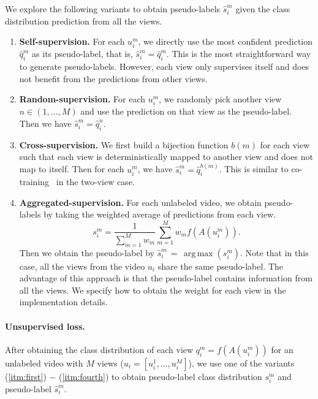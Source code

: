 \documentclass[10pt,twocolumn,letterpaper]{article}
\DeclareMathOperator*{\argmax}{arg\,max}
\begin{document}
We explore the following variants to obtain pseudo-labels $\hat{s}_i^m$ given the class distribution prediction from all the views.
\begin{enumerate}[label=\roman*]
	\item\label{itm:first}  \textbf{Self-supervision.} For each  $u_i^m$, we directly use the most confident prediction $\hat{q}_i^m$ as its pseudo-label, that is, $\hat{s}_i^m=\hat{q}_i^m$.
	This is the most straightforward way to generate pseudo-labels. However, each view only supervises itself and does not benefit from the predictions from other views.
	
	
	\item\label{itm:second}  \textbf{Random-supervision.} 
	For each  $u_i^m$, we randomly pick another view 
	$n \in (1,\ldots,M)$ and use the prediction on that view as the pseudo-label. Then we have $\hat{s}_i^m=\hat{q}_i^n$.
	
	\item\label{itm:third}  \textbf{Cross-supervision.} We first build a bijection function $b(m)$ for each view such that each view is deterministically mapped to another view and does not map to itself.  Then for each $u_i^m$, we  have $\hat{s}_i^m=\hat{q}_i^{b(m)}$.
	This is similar to co-training~\cite{blum1998combining} in the two-view case.
	
	\item\label{itm:fourth}  \textbf{Aggregated-supervision.} For each unlabeled video, we obtain pseudo-labels by taking the weighted average of predictions from each view. 
	\begin{equation}
		\label{eq:loss1}
		s_i^m = \frac{1}{\sum_{m=1}^{M} {w_m}}\sum_{m=1}^{M} w_m f(A(u_{i}^{m})).
	\end{equation}
	Then we obtain the  pseudo-label by $\hat{s}_i^m\,{=}\,\argmax(s_i^m)$.
	Note that in this case, all the views from the video $u_{i}$ share the same pseudo-label. The advantage of this approach is that the pseudo-label contains information from all the views. {We specify how to obtain the weight for each view in the implementation details.}
\end{enumerate}

\paragraph{Unsupervised loss.} 
After obtaining the class distribution of each view  $q_i^m = f(A(u_i^m))$ {for} an unlabeled video with $M$ views ($u_i=[u_i^1,...,u_i^M]$), we use one of the variants (\ref{itm:first}) $-$ (\ref{itm:fourth}) to obtain pseudo-label class distribution $s_i^m$ and pseudo-label $\hat{s}_i^m$. 
\end{document}
